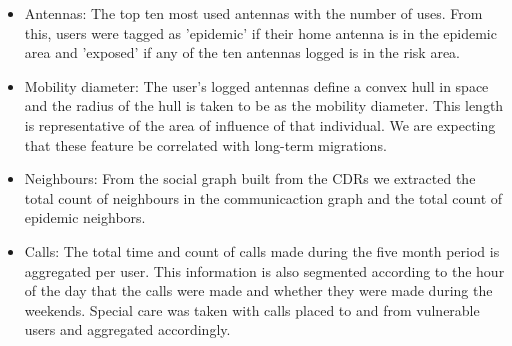 \begin{itemize}
    \item Antennas: The top ten most used antennas with the number of uses. From this, users were tagged as 'epidemic' if their home antenna is in the epidemic area and 'exposed' if any of the ten antennas logged is in the risk area.
    \item Mobility diameter: The user's logged antennas define a convex hull in space and the radius of the hull is taken to be as the mobility diameter. This length is representative of the area of influence of that individual. We are expecting that these feature be correlated with long-term migrations.
    \item Neighbours: From the social graph built from the CDRs we extracted the total count of neighbours in the communicaction graph and the total count of epidemic neighbors. 
    \item Calls: The total time and count of calls made during the five month period is aggregated per user. This information is also segmented according to the hour of the day that the calls were made and whether they were made during the weekends. Special care was taken with calls placed to and from vulnerable users and aggregated accordingly.
\end{itemize}